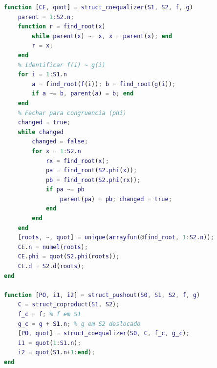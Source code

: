 \begin{lstlisting}[language=Matlab, caption={Coequalizador e Pushout em Struct}]
function [CE, quot] = struct_coequalizer(S1, S2, f, g)
    parent = 1:S2.n;
    function r = find_root(x)
        while parent(x) ~= x, x = parent(x); end
        r = x;
    end
    % Identificar f(i) ~ g(i)
    for i = 1:S1.n
        a = find_root(f(i)); b = find_root(g(i));
        if a ~= b, parent(a) = b; end
    end
    % Fechar para congruencia (phi)
    changed = true;
    while changed
        changed = false;
        for x = 1:S2.n
            rx = find_root(x);
            pa = find_root(S2.phi(x));
            pb = find_root(S2.phi(rx));
            if pa ~= pb
                parent(pa) = pb; changed = true;
            end
        end
    end
    [roots, ~, quot] = unique(arrayfun(@find_root, 1:S2.n));
    CE.n = numel(roots);
    CE.phi = quot(S2.phi(roots));
    CE.d = S2.d(roots);
end

function [PO, i1, i2] = struct_pushout(S0, S1, S2, f, g)
    C = struct_coproduct(S1, S2);
    f_c = f; % f em S1
    g_c = g + S1.n; % g em S2 deslocado
    [PO, quot] = struct_coequalizer(S0, C, f_c, g_c);
    i1 = quot(1:S1.n);
    i2 = quot(S1.n+1:end);
end
\end{lstlisting}